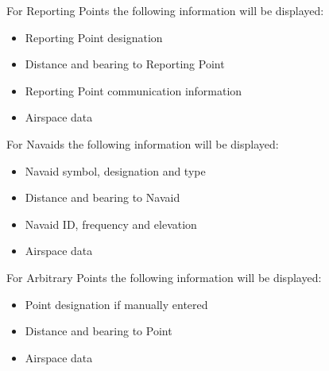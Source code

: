 \documentclass[letterpaper,10pt,english]{sphinxmanual}
\begin{document}
\sphinxAtStartPar
For Reporting Points the following information will be displayed:
\begin{itemize}
\item {} 
\sphinxAtStartPar
Reporting Point designation

\item {} 
\sphinxAtStartPar
Distance and bearing to Reporting Point

\item {} 
\sphinxAtStartPar
Reporting Point communication information

\item {} 
\sphinxAtStartPar
Airspace data

\end{itemize}

\sphinxAtStartPar
For Navaids the following information will be displayed:
\begin{itemize}
\item {} 
\sphinxAtStartPar
Navaid symbol, designation and type

\item {} 
\sphinxAtStartPar
Distance and bearing to Navaid

\item {} 
\sphinxAtStartPar
Navaid ID, frequency and elevation

\item {} 
\sphinxAtStartPar
Airspace data

\end{itemize}

\sphinxAtStartPar
For Arbitrary Points the following information will be displayed:
\begin{itemize}
\item {} 
\sphinxAtStartPar
Point designation if manually entered

\item {} 
\sphinxAtStartPar
Distance and bearing to Point

\item {} 
\sphinxAtStartPar
Airspace data

\end{itemize}

\begin{figure}[htbp]
\centering

\noindent{}
\end{figure}
\end{document}
